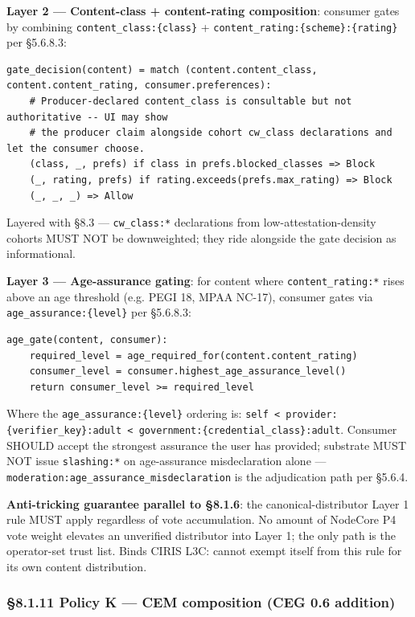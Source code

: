 \documentclass[10pt]{article}
\begin{document}
\textbf{Layer 2 — Content-class + content-rating composition}: consumer gates by combining \texttt{content\_class:\{class\}} + \texttt{content\_rating:\{scheme\}:\{rating\}} per §5.6.8.3:


\begin{lstlisting}
gate_decision(content) = match (content.content_class, content.content_rating, consumer.preferences):
    # Producer-declared content_class is consultable but not authoritative -- UI may show
    # the producer claim alongside cohort cw_class declarations and let the consumer choose.
    (class, _, prefs) if class in prefs.blocked_classes => Block
    (_, rating, prefs) if rating.exceeds(prefs.max_rating) => Block
    (_, _, _) => Allow
\end{lstlisting}

Layered with §8.3 — \texttt{cw\_class:*} declarations from low-attestation-density cohorts MUST NOT be downweighted; they ride alongside the gate decision as informational.


\textbf{Layer 3 — Age-assurance gating}: for content where \texttt{content\_rating:*} rises above an age threshold (e.g. PEGI 18, MPAA NC-17), consumer gates via \texttt{age\_assurance:\{level\}} per §5.6.8.3:


\begin{lstlisting}
age_gate(content, consumer):
    required_level = age_required_for(content.content_rating)
    consumer_level = consumer.highest_age_assurance_level()
    return consumer_level >= required_level
\end{lstlisting}

Where the \texttt{age\_assurance:\{level\}} ordering is: \texttt{self < provider:\{verifier\_key\}:adult < government:\{credential\_class\}:adult}. Consumer SHOULD accept the strongest assurance the user has provided; substrate MUST NOT issue \texttt{slashing:*} on age-assurance misdeclaration alone — \texttt{moderation:age\_assurance\_misdeclaration} is the adjudication path per §5.6.4.


\textbf{Anti-tricking guarantee parallel to §8.1.6}: the canonical-distributor Layer 1 rule MUST apply regardless of vote accumulation. No amount of NodeCore P4 vote weight elevates an unverified distributor into Layer 1; the only path is the operator-set trust list. Binds CIRIS L3C: cannot exempt itself from this rule for its own content distribution.


\subsubsection*{§8.1.11 Policy K — CEM composition (CEG 0.6 addition)}
\end{document}
